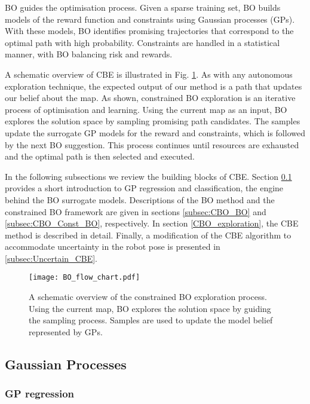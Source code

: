 \documentclass[shortAfour,sageh,times]{sagej_no_sage}
\begin{document}
BO guides the optimisation process. Given a sparse training set, BO builds models of the reward function and constraints using Gaussian processes (GPs). 
With these models, BO identifies promising trajectories that correspond to the optimal path with high probability. Constraints are handled in a statistical manner, with BO balancing risk and rewards.

A schematic overview of CBE is illustrated in Fig. \ref{fig:bo_flow_chart}. As with any autonomous exploration technique, the expected output of our method is a path that updates our belief about the map. As shown, constrained BO exploration is an iterative process of optimisation and learning. Using the current map as an input, BO explores the solution space by sampling promising path candidates. The samples update the surrogate GP models for the reward and constraints, which is followed by the next BO suggestion. This process continues until resources are exhausted and the optimal path is then selected and executed.

In the following subsections we review the building blocks of CBE. Section \ref{subsec:CBO_GP} provides a short introduction to GP regression and classification, the engine behind the BO surrogate models. Descriptions of the BO method and the constrained BO framework are given in sections \ref{subsec:CBO_BO} and \ref{subsec:CBO_Const_BO}, respectively. In section \ref{CBO_exploration}, the CBE method is described in detail. Finally, a modification of the CBE algorithm to accommodate uncertainty in the robot pose is presented in \ref{subsec:Uncertain_CBE}.

\begin{figure}[bt]
	
	\centering
	
	\texttt{[image: BO\_flow\_chart.pdf]}
	
	\caption{A schematic overview of the constrained BO exploration process. Using the current map, BO explores the solution space by guiding the sampling process. Samples are used to update the model belief represented by GPs.  }
	\label{fig:bo_flow_chart}
\end{figure}

\subsection{Gaussian Processes} \label{subsec:CBO_GP}
\subsubsection{GP regression}
	
\end{document}
